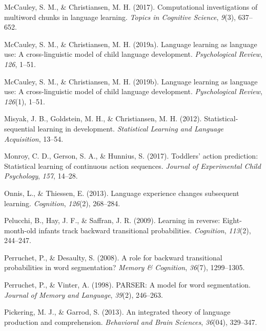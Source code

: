 \documentclass[
  english,
  man,mask,floatsintext]{apa6}
\begin{document}
\leavevmode\hypertarget{ref-mccauley2017computational}{}%
McCauley, S. M., \& Christiansen, M. H. (2017). Computational investigations of multiword chunks in language learning. \emph{Topics in Cognitive Science}, \emph{9}(3), 637--652.

\leavevmode\hypertarget{ref-mccauley2019language}{}%
McCauley, S. M., \& Christiansen, M. H. (2019a). Language learning as language use: A cross-linguistic model of child language development. \emph{Psychological Review}, \emph{126}, 1--51.

\leavevmode\hypertarget{ref-mccauley2019languagelearning}{}%
McCauley, S. M., \& Christiansen, M. H. (2019b). Language learning as language use: A cross-linguistic model of child language development. \emph{Pyschological Review}, \emph{126}(1), 1--51.

\leavevmode\hypertarget{ref-misyak2012statistical}{}%
Misyak, J. B., Goldstein, M. H., \& Christiansen, M. H. (2012). Statistical-sequential learning in development. \emph{Statistical Learning and Language Acquisition}, 13--54.

\leavevmode\hypertarget{ref-monroy2017toddlers}{}%
Monroy, C. D., Gerson, S. A., \& Hunnius, S. (2017). Toddlers' action prediction: Statistical learning of continuous action sequences. \emph{Journal of Experimental Child Psychology}, \emph{157}, 14--28.

\leavevmode\hypertarget{ref-onnis2013language}{}%
Onnis, L., \& Thiessen, E. (2013). Language experience changes subsequent learning. \emph{Cognition}, \emph{126}(2), 268--284.

\leavevmode\hypertarget{ref-pelucchi2009learning}{}%
Pelucchi, B., Hay, J. F., \& Saffran, J. R. (2009). Learning in reverse: Eight-month-old infants track backward transitional probabilities. \emph{Cognition}, \emph{113}(2), 244--247.

\leavevmode\hypertarget{ref-perruchet2008role}{}%
Perruchet, P., \& Desaulty, S. (2008). A role for backward transitional probabilities in word segmentation? \emph{Memory \& Cognition}, \emph{36}(7), 1299--1305.

\leavevmode\hypertarget{ref-perruchet1998parser}{}%
Perruchet, P., \& Vinter, A. (1998). PARSER: A model for word segmentation. \emph{Journal of Memory and Language}, \emph{39}(2), 246--263.

\leavevmode\hypertarget{ref-pickering2013integrated}{}%
Pickering, M. J., \& Garrod, S. (2013). An integrated theory of language production and comprehension. \emph{Behavioral and Brain Sciences}, \emph{36}(04), 329--347.
\end{document}

